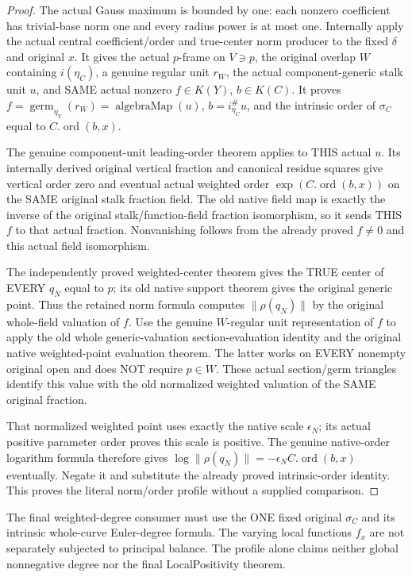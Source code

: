 \begin{proof}
The actual Gauss maximum is bounded by one: each nonzero coefficient
has trivial-base norm one and every radius power is at most one.
Internally apply the actual central coefficient/order and true-center norm
producer to the fixed $\delta$ and original $x$.  It gives the actual
$p$-frame on $V\ni p$, the original overlap $W$ containing $i(\eta_C)$,
a genuine regular unit $r_W$, the actual component-generic stalk unit
$u$, and SAME actual nonzero $f\in K(Y)$, $b\in K(C)$.  It proves
$f=\operatorname{germ}_{\eta_Y}(r_W)=\operatorname{algebraMap}(u)$,
$b=i^\#_{\eta_C}u$, and the intrinsic order of $\sigma_C$ equal to
$C.\operatorname{ord}(b,x)$.

The genuine component-unit leading-order theorem applies to THIS actual
$u$.  Its internally derived original vertical fraction and canonical
residue squares give vertical order zero and eventual actual weighted
order $\exp(C.\operatorname{ord}(b,x))$ on the SAME original stalk fraction
field.  The old native field map is exactly the inverse of the original
stalk/function-field fraction isomorphism, so it sends THIS $f$ to
that actual fraction.  Nonvanishing follows from the already proved
$f\ne0$ and this actual field isomorphism.

The independently proved weighted-center theorem gives the TRUE center
of EVERY $q_N$ equal to $p$; its old native support theorem gives the
original generic point.  Thus the retained norm formula computes
$\|\rho(q_N)\|$ by the original whole-field valuation of $f$.
Use the genuine $W$-regular unit representation of $f$ to apply the old
whole generic-valuation section-evaluation identity and the original
native weighted-point evaluation theorem.  The latter works on EVERY
nonempty original open and does NOT require $p\in W$.  These actual
section/germ triangles identify this value with the old normalized
weighted valuation of the SAME original fraction.

That normalized weighted point uses exactly the native scale
$\epsilon_N$; its actual positive parameter order proves this scale is
positive.  The genuine native-order logarithm formula therefore gives
$\log\|\rho(q_N)\|=-\epsilon_N C.\operatorname{ord}(b,x)$ eventually.
Negate it and substitute the already proved intrinsic-order identity.
This proves the literal norm/order profile without a supplied comparison.
\end{proof}

The final weighted-degree consumer must use the ONE fixed original
$\sigma_C$ and its intrinsic whole-curve Euler-degree formula.  The varying
local functions $f_x$ are not separately subjected to principal balance.
The profile alone claims neither global nonnegative degree nor the final
LocalPositivity theorem.
